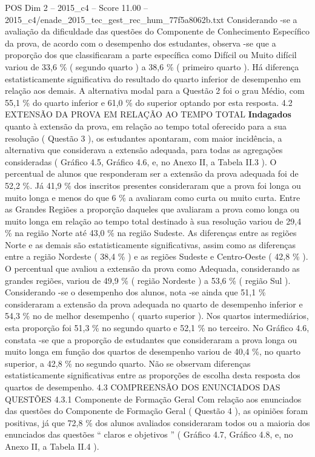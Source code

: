 \begin{textsample}{POS Dim 2 – 2015\_c4 – Score 11.00 – 2015\_c4/enade\_2015\_tec\_gest\_rec\_hum\_77f5a8062b.txt}
Considerando -se a avaliação da dificuldade das questões do Componente de Conhecimento Específico da prova, de acordo com o desempenho dos estudantes, observa -se que a proporção dos que classificaram a parte específica como Difícil ou Muito difícil variou de 33,6 \% ( segundo quarto ) a 38,6 \% ( primeiro quarto ).
Há diferença estatisticamente significativa do resultado do quarto inferior de desempenho em relação aos demais.
A alternativa modal para a Questão 2 foi o grau Médio, com 55,1 \% do quarto inferior e 61,0 \% do superior optando por esta resposta. 4.2 EXTENSÃO DA PROVA EM RELAÇÃO AO TEMPO TOTAL \textbf{Indagados} quanto à extensão da prova, em relação ao tempo total oferecido para a sua resolução ( Questão 3 ), os estudantes apontaram, com maior incidência, a alternativa que considerava a extensão adequada, para todas as agregações consideradas ( Gráfico 4.5, Gráfico 4.6, e, no Anexo II, a Tabela II.3 ).
O percentual de alunos que responderam ser a extensão da prova adequada foi de 52,2 \%.
Já 41,9 \% dos inscritos presentes consideraram que a prova foi longa ou muito longa e menos do que 6 \% a avaliaram como curta ou muito curta.
Entre as Grandes Regiões a proporção daqueles que avaliaram a prova como longa ou muito longa em relação ao tempo total destinado à sua resolução variou de 29,4 \% na região Norte até 43,0 \% na região Sudeste.
As diferenças entre as regiões Norte e as demais são estatisticamente significativas, assim como as diferenças entre a região Nordeste ( 38,4 \% ) e as regiões Sudeste e Centro-Oeste ( 42,8 \% ).
O percentual que avaliou a extensão da prova como Adequada, considerando as grandes regiões, variou de 49,9 \% ( região Nordeste ) a 53,6 \% ( região Sul ).
Considerando -se o desempenho dos alunos, nota -se ainda que 51,1 \% consideraram a extensão da prova adequada no quarto de desempenho inferior e 54,3 \% no de melhor desempenho ( quarto superior ).
Nos quartos intermediários, esta proporção foi 51,3 \% no segundo quarto e 52,1 \% no terceiro.
No Gráfico 4.6, constata -se que a proporção de estudantes que consideraram a prova longa ou muito longa em função dos quartos de desempenho variou de 40,4 \%, no quarto superior, a 42,8 \% no segundo quarto.
Não se observam diferenças estatisticamente significativas entre as proporções de escolha desta resposta dos quartos de desempenho. 4.3 COMPREENSÃO DOS ENUNCIADOS DAS QUESTÕES 4.3.1 Componente de Formação Geral Com relação aos enunciados das questões do Componente de Formação Geral ( Questão 4 ), as opiniões foram positivas, já que 72,8 \% dos alunos avaliados consideraram todos ou a maioria dos enunciados das questões “ claros e objetivos ” ( Gráfico 4.7, Gráfico 4.8, e, no Anexo II, a Tabela II.4 ).

\end{textsample}

